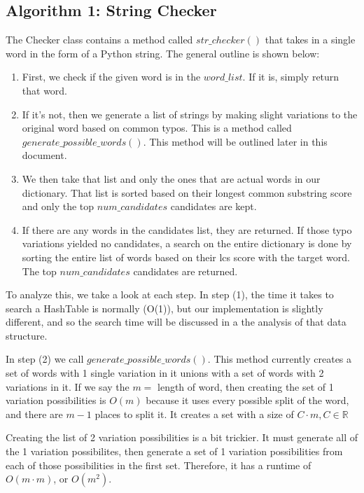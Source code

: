 \documentclass[10pt]{article}
\theoremstyle{definition}
\newcommand{\RR}{\mathbb{R}} %
\begin{document}
\subsection{Algorithm 1: String Checker}
The Checker class contains a method called $str\_checker()$ that takes in a single word in the form of a Python string. The general outline is shown below:
\begin{enumerate}
    \item First, we check if the given word is in the $word\_list$. If it is, simply return that word.
    \item If it's not, then we generate a list of strings by making slight variations to the original word based on common typos. This is a method called $generate\_possible\_words()$. This method will be outlined later in this document.
    \item We then take that list and only the ones that are actual words in our dictionary. That list is sorted based on their longest common substring score and only the top $num\_candidates$ candidates are kept.
    \item If there are any words in the candidates list, they are returned. If those typo variations yielded no candidates, a search on the entire dictionary is done by sorting the entire list of words based on their lcs score with the target word. The top $num\_candidates$ candidates are returned.
\end{enumerate}

To analyze this, we take a look at each step. In step (1), the time it takes to search a HashTable is normally (O(1)), but our implementation is slightly different, and so the search time will be discussed in a the analysis of that data structure.\newline \newline

In step (2) we call $generate\_possible\_words()$. This method currently creates a set of words with 1 single variation in it unions with a set of words with 2 variations in it. If we say the $m = $ length of word, then creating the set of 1 variation possibilities is $O(m)$ because it uses every possible split of the word, and there are $m - 1$ places to split it. It creates a set with a size of $C \cdot m, C \in \RR$

Creating the list of 2 variation possibilities is a bit trickier. It must generate all of the 1 variation possibilites, then generate a set of 1 variation possibilities from each of those possibilities in the first set. Therefore, it has a runtime of $O(m \cdot m)$, or $O(m^2)$.
\end{document}
